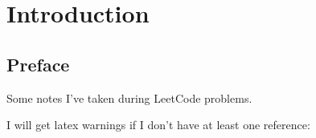 \chapter[Introduction]
{Introduction
  \label{ch0introduction}}

\section{Preface}

Some notes I've taken during LeetCode problems.

I will get latex warnings if I don't have at least one reference:
\cite{wiki_templatecpp}
